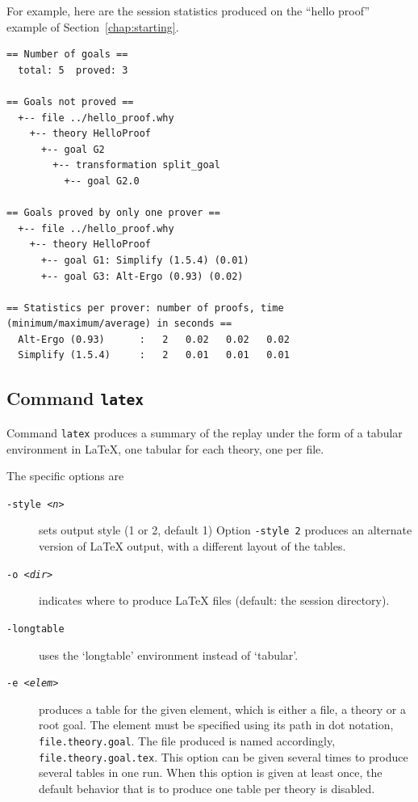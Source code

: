 For example, here are the session statistics produced on the ``hello
proof'' example of Section~\ref{chap:starting}.
{\footnotesize
\begin{verbatim}
== Number of goals ==
  total: 5  proved: 3

== Goals not proved ==
  +-- file ../hello_proof.why
    +-- theory HelloProof
      +-- goal G2
        +-- transformation split_goal
          +-- goal G2.0

== Goals proved by only one prover ==
  +-- file ../hello_proof.why
    +-- theory HelloProof
      +-- goal G1: Simplify (1.5.4) (0.01)
      +-- goal G3: Alt-Ergo (0.93) (0.02)

== Statistics per prover: number of proofs, time (minimum/maximum/average) in seconds ==
  Alt-Ergo (0.93)      :   2   0.02   0.02   0.02
  Simplify (1.5.4)     :   2   0.01   0.01   0.01
\end{verbatim}
}

\subsection{Command \texttt{latex}}

Command \texttt{latex} produces a summary of the replay under the form
of a tabular environment in LaTeX, one tabular for each theory, one
per file.

The specific options are
\begin{description}
\item[\texttt{-style \textsl{<n>}}] sets output style (1 or 2, default 1)
  Option \texttt{-style 2} produces an alternate version of LaTeX
  output, with a different layout of the tables.
\item[\texttt{-o \textsl{<dir>}}] indicates where
  to produce LaTeX files (default: the session directory).
\item[\texttt{-longtable}] uses the `longtable' environment instead of
  `tabular'.
\item[\texttt{-e \textsl{<elem>}}] produces a table for the given element, which is
  either a file, a theory or a root goal. The element must be specified
  using its path in dot notation, \eg \verb|file.theory.goal|. The
  file produced is named accordingly,
  \eg \verb|file.theory.goal.tex|.  This option can be given several
  times to produce several tables in one run. When this option is
  given at least once, the default behavior that is to produce one
  table per theory is disabled.
\end{description}

